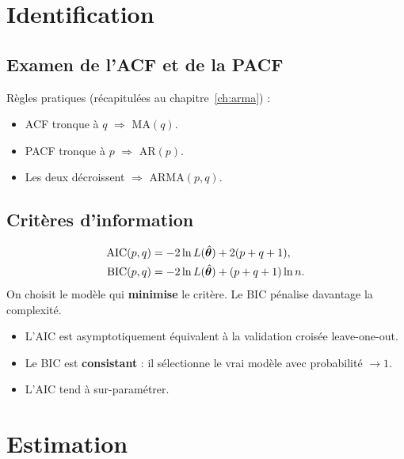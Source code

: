 \section{Identification}

\subsection{Examen de l'ACF et de la PACF}

R\`egles pratiques (r\'ecapitul\'ees au chapitre~\ref{ch:arma}) :
\begin{itemize}
\item ACF tronque \`a $q$ $\Rightarrow$ MA$(q)$.
\item PACF tronque \`a $p$ $\Rightarrow$ AR$(p)$.
\item Les deux d\'ecroissent $\Rightarrow$ ARMA$(p,q)$.
\end{itemize}

\subsection{Crit\`eres d'information}

\begin{definition}
\begin{align}
\operatorname{AIC}(p,q) &= -2\ln L(\hat{\bm\theta}) + 2(p+q+1), \\
\operatorname{BIC}(p,q) &= -2\ln L(\hat{\bm\theta}) + (p+q+1)\ln n.
\end{align}
On choisit le mod\`ele qui \textbf{minimise} le crit\`ere. Le BIC p\'enalise davantage la complexit\'e.
\end{definition}

\begin{theoreme}
\begin{itemize}
\item L'AIC est asymptotiquement \'equivalent \`a la validation crois\'ee leave-one-out.
\item Le BIC est \textbf{consistant} : il s\'electionne le vrai mod\`ele avec probabilit\'e $\to 1$.
\item L'AIC tend \`a sur-param\'etrer.
\end{itemize}
\end{theoreme}

\section{Estimation}

